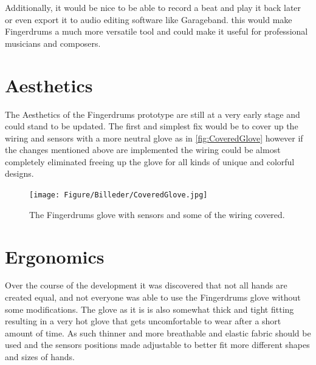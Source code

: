 Additionally, it would be nice to be able to record a beat and play it back later or even export it to audio editing software like Garageband. this would make Fingerdrums a much more versatile tool and could make it useful for professional musicians and composers. 



\section{Aesthetics }
The Aesthetics of the Fingerdrums prototype are still at a very early stage and could stand to be updated. The first and simplest fix would be to cover up the wiring and sensors with a more neutral glove as in \autoref{fig:CoveredGlove} however if the changes mentioned above are implemented the wiring could be almost completely eliminated freeing up the glove for all kinds of unique and colorful designs.

\begin{figure}[H]
\centering
\texttt{[image: Figure/Billeder/CoveredGlove.jpg]}
\caption{The Fingerdrums glove with sensors and some of the wiring covered.}
\label{fig:CoveredGlove}
\end{figure}

\section{Ergonomics}
Over the course of the development it was discovered that not all hands are created equal, and not everyone was able to use the Fingerdrums glove without some modifications. The glove as it is is also somewhat thick and tight fitting resulting in a very hot glove that gets uncomfortable to wear after a short amount of time. As such thinner and more breathable and elastic fabric should be used and the sensors  positions made adjustable to better fit more different shapes and sizes of hands. 